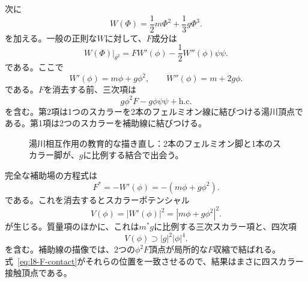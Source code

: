 次に
\begin{equation}
W(\Phi)=\frac12m\Phi^2+\frac13g\Phi^3.
\label{eq:l8-superpotential}
\end{equation}
を加える。一般の正則な\(W\)に対して、\(F\)成分は
\begin{equation}
\left.W(\Phi)\right|_{\theta^2}
=F W'(\phi)-\frac12W''(\phi)\psi\psi.
\label{eq:l8-W-components}
\end{equation}
である。ここで
\begin{equation}
W'(\phi)=m\phi+g\phi^2,
\qquad
W''(\phi)=m+2g\phi.
\end{equation}
である。\(F\)を消去する前、三次項は
\begin{equation}
g\phi^2F-g\phi\psi\psi+\text{h.c.}
\label{eq:l8-cubic-offshell}
\end{equation}
を含む。第2項は1つのスカラーを2本のフェルミオン線に結びつける湯川頂点である。第1項は2つのスカラーを補助線に結びつける。

\begin{figure}[H]
\centering
{}
\caption{湯川相互作用の教育的な描き直し：2本のフェルミオン脚と1本のスカラー脚が、\(g\)に比例する結合で出会う。}
\end{figure}

完全な補助場の方程式は
\begin{equation}
F^\ast=-W'(\phi)=-(m\phi+g\phi^2).
\label{eq:l8-general-F-equation}
\end{equation}
である。これを消去するとスカラーポテンシャル
\begin{equation}
V(\phi)=|W'(\phi)|^2
=|m\phi+g\phi^2|^2.
\label{eq:l8-scalar-potential}
\end{equation}
が生じる。質量項のほかに、これは\(m^\ast g\)に比例する三次スカラー項と、四次項
\begin{equation}
V(\phi)\supset |g|^2|\phi|^4.
\label{eq:l8-quartic}
\end{equation}
を含む。補助線の描像では、2つの\(\phi^2F\)頂点が局所的な\(F\)収縮で結ばれる。式~\eqref{eq:l8-F-contact}がそれらの位置を一致させるので、結果はまさに四スカラー接触頂点である。

